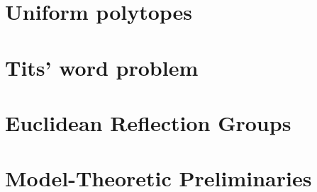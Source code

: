 \documentclass[a4paper,11pt, titlepage]{article}
\begin{document}
\section{Uniform polytopes}


\section{Tits' word problem}


\section{Euclidean Reflection Groups}


\appendix
\section{Model-Theoretic Preliminaries}\label{Model Theory}



\end{document}
